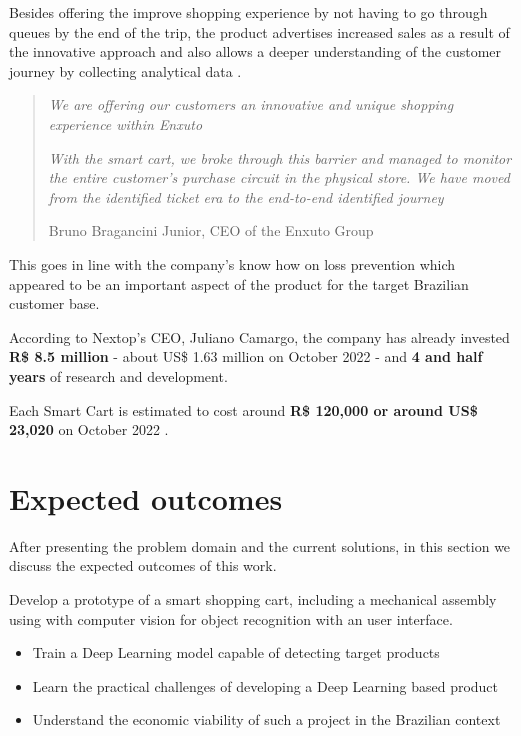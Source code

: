 \documentclass[openright]{normas-utf-tex} %
\begin{document}
Besides offering the improve shopping experience by not having to go through queues by the end of the trip, the product advertises increased sales
as a result of the innovative approach and also allows a deeper understanding of the customer journey by collecting analytical data \cite{Paraiba2022}.

\begin{quote}
\textit{We are offering our customers an innovative and unique shopping experience within Enxuto}

\textit{With the smart cart, we broke through this barrier and managed to monitor the
entire customer's purchase circuit in the physical store. We have moved
from the identified ticket era to the end-to-end identified journey}

Bruno Bragancini Junior, CEO of the Enxuto Group \cite{Paraiba2022}
\end{quote}


This goes in line with the
company's know how on loss prevention which appeared to be an important aspect
of the product for the target Brazilian customer base.


According to Nextop's CEO, Juliano Camargo, the company has already invested \textbf{R\$ 8.5 million} - about US\$ 1.63 million on October 2022 - and \textbf{4 and half years}
of research and development.

Each Smart Cart is estimated to cost around \textbf{R\$ 120,000  or around US\$ 23,020} on October 2022 \cite{Paraiba2022}.

\section{Expected outcomes}

After presenting the problem domain and the current solutions, in this section we discuss the expected
outcomes of this work.

Develop a prototype of a smart shopping cart, including a mechanical assembly using with computer vision for object recognition with
an user interface.

\begin{itemize}
    \item Train a Deep Learning model capable of detecting target products
	\item Learn the practical challenges of developing a Deep Learning based product
    \item Understand the economic viability of such a project in the Brazilian context
\end{itemize}
\end{document}
